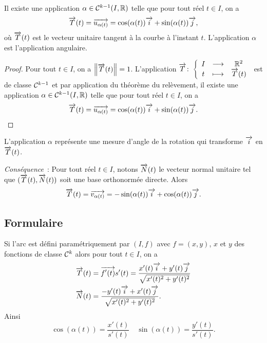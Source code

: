 \begin{prop}
  Il existe une application \(\alpha \in \mathcal{C}^{k-1}(I, \mathbb{R})\) telle que pour
  tout réel \(t \in I\), on a
  \begin{equation}
    \overrightarrow{T}(t) = \overrightarrow{u_{\alpha(t)}} = \cos(\alpha(t)) \overrightarrow{i} + \sin(\alpha(t))
    \overrightarrow{j},
  \end{equation}
  où \(\overrightarrow{T}(t)\) est le vecteur unitaire tangent à la courbe à l'instant
  \(t\). L'application \(\alpha\) est l'application angulaire.
\end{prop}
\begin{proof}
  Pour tout \(t \in I\), on a \(\left\lVert\overrightarrow{T}(t)\right\rVert=1\). L'application
  \(\overrightarrow{T}\colon\left\{\begin{array}{ccc}I & \longrightarrow &\mathbb{R}^2\\t & \longmapsto & \overrightarrow{T}(t)\end{array}\right.\) est de classe
  \(\mathcal{C}^{k-1}\) et par application du théorème du relèvement, il existe une
  application \(\alpha \in \mathcal{C}^{k-1}(I, \mathbb{R})\) telle que pour tout réel \(t
  \in I\), on a
  \begin{equation}
    \overrightarrow{T}(t) = \overrightarrow{u_{\alpha(t)}} = \cos(\alpha(t)) \overrightarrow{i} + \sin(\alpha(t))
    \overrightarrow{j}.
  \end{equation}
\end{proof}

L'application \(\alpha\) représente une mesure d'angle de la rotation qui
transforme \(\overrightarrow{i}\) en \(\overrightarrow{T}(t)\).

\emph{Conséquence}~: Pour tout réel \(t \in I\), notons \(\overrightarrow{N}(t)\) le
vecteur normal unitaire tel que \((\overrightarrow{T}(t), \overrightarrow{N}(t))\) soit une base
orthonormée directe. Alors \begin{equation}
  \overrightarrow{T}(t) = \overrightarrow{v_{\alpha(t)}} = -\sin(\alpha(t)) \overrightarrow{i} + \cos(\alpha(t))
  \overrightarrow{j}.
\end{equation}

\subsection{Formulaire}

Si l'arc est défini paramétriquement par \((I,f)\) avec \(f=(x,y)\), \(x\) et
\(y\) des fonctions de classe \(\mathcal{C}^{k}\) alors pour tout \(t \in I\), on a
\begin{align}
  \overrightarrow{T}(t) &= \overrightarrow{f'(t)}{s'(t)} =
  \frac{x'(t)\overrightarrow{i}+y'(t)\overrightarrow{j}}{\sqrt{x'(t)^2+y'(t)^2}} \\
  \overrightarrow{N}(t) &= \frac{-y'(t)\overrightarrow{i}+x'(t)\overrightarrow{j}}{\sqrt{x'(t)^2+y'(t)^2}}.
\end{align}
Ainsi
\begin{equation}
  \cos(\alpha(t)) = \frac{x'(t)}{s'(t)} \quad \sin(\alpha(t)) =
  \frac{y'(t)}{s'(t)}.
\end{equation}

